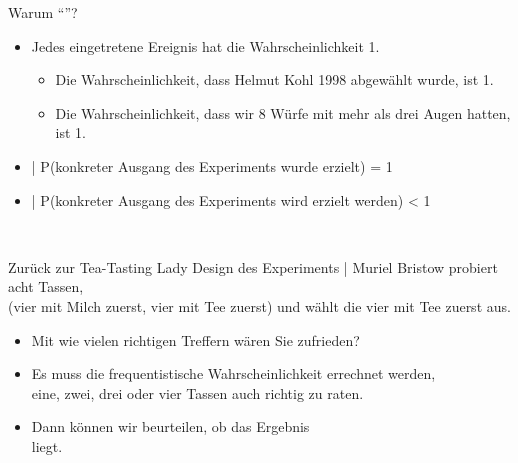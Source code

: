 \begin{frame}
  {Warum "`"'?}
  \\
    \Zeile
    \begin{itemize}[<+->]
      \item Jedes eingetretene Ereignis hat die Wahrscheinlichkeit 1.
        \Halbzeile
        \begin{itemize}[<+->]
          \item Die Wahrscheinlichkeit, dass Helmut Kohl 1998 abgewählt wurde, ist 1.
            \Viertelzeile
          \item Die Wahrscheinlichkeit, dass wir 8 Würfe mit mehr als drei Augen hatten, ist 1.
        \end{itemize}
      \Halbzeile
      \item {} | P(konkreter Ausgang des Experiments wurde erzielt) = 1
      \item {} | P(konkreter Ausgang des Experiments wird erzielt werden) < 1
    \end{itemize}
    \Zeile
    \centering 
    \\
\end{frame}

\begin{frame}
  {Zurück zur Tea-Tasting Lady}
  \alert{Design des Experiments} | Muriel Bristow probiert \alert{acht Tassen},\\
  (vier mit Milch zuerst, vier mit Tee zuerst) und \alert{wählt die vier mit Tee zuerst aus}.\\
  \Zeile
  \begin{itemize}[<+->]
    \item \alert{Mit wie vielen richtigen Treffern wären Sie zufrieden?}
      \Halbzeile
    \item Es muss die \alert{frequentistische Wahrscheinlichkeit} errechnet werden,\\
      eine, zwei, drei oder vier Tassen auch  richtig zu raten.
      \Halbzeile
    \item Dann können wir beurteilen, ob das Ergebnis\\
      \textit{ } liegt.
  \end{itemize}
\end{frame}

